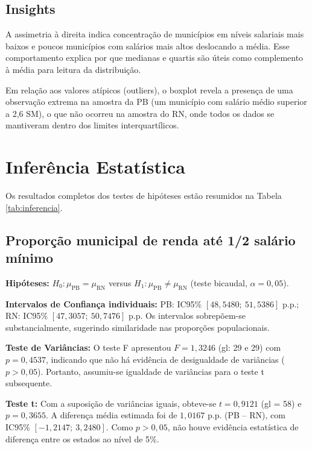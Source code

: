 \documentclass[10pt, a4paper, twocolumn]{article}
\begin{document}
\subsection{Insights}
A assimetria à direita indica concentração de municípios em níveis salariais mais baixos e poucos municípios com salários mais altos deslocando a média. Esse comportamento explica por que medianas e quartis são úteis como complemento à média para leitura da distribuição.

Em relação aos valores atípicos (outliers), o boxplot revela a presença de uma observação extrema na amostra da PB (um município com salário médio superior a 2,6 SM), o que não ocorreu na amostra do RN, onde todos os dados se mantiveram dentro dos limites interquartílicos.

\FloatBarrier

\section{Inferência Estatística}
Os resultados completos dos testes de hipóteses estão resumidos na Tabela \ref{tab:inferencia}.



\subsection{Proporção municipal de renda até 1/2 salário mínimo}

\textbf{Hipóteses:} $H_0: \mu_{\text{PB}} = \mu_{\text{RN}}$ versus $H_1: \mu_{\text{PB}} \neq \mu_{\text{RN}}$ (teste bicaudal, $\alpha = 0{,}05$).

\textbf{Intervalos de Confiança individuais:} PB: IC95\% $[48{,}5480;\ 51{,}5386]$ p.p.; RN: IC95\% $[47{,}3057;\ 50{,}7476]$ p.p. Os intervalos sobrepõem-se substancialmente, sugerindo similaridade nas proporções populacionais.

\textbf{Teste de Variâncias:} O teste F apresentou $F = 1{,}3246$ (gl: 29 e 29) com $p = 0{,}4537$, indicando que não há evidência de desigualdade de variâncias ($p > 0{,}05$). Portanto, assumiu-se igualdade de variâncias para o teste t subsequente.

\textbf{Teste t:} Com a suposição de variâncias iguais, obteve-se $t = 0{,}9121$ (gl = 58) e $p = 0{,}3655$. A diferença média estimada foi de $1{,}0167$ p.p. (PB -- RN), com IC95\% $[-1{,}2147;\ 3{,}2480]$. Como $p > 0{,}05$, não houve evidência estatística de diferença entre os estados ao nível de 5\%.
\end{document}
